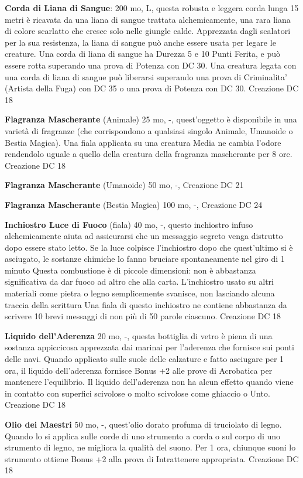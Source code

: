 \documentclass[a4paper,11pt,twoside,openany]{book}
\begin{document}
\textbf{Corda di Liana di Sangue}: 200 mo, L, questa robusta e leggera corda lunga 15 metri è ricavata da una liana di sangue trattata alchemicamente, una rara liana di colore scarlatto che cresce solo nelle giungle calde.
Apprezzata dagli scalatori per la sua resistenza, la liana di sangue può anche essere usata per legare le creature. Una corda di liana di sangue ha Durezza 5 e 10 Punti Ferita, e può essere rotta superando una prova di Potenza con DC 30.
Una creatura legata con una corda di liana di sangue può liberarsi superando una prova di Criminalita’ (Artista della Fuga) con DC 35 o una prova di Potenza con DC 30. Creazione DC 18

\textbf{Flagranza Mascherante} (Animale) 25 mo, -, quest'oggetto è disponibile in una varietà di fragranze (che corrispondono a qualsiasi singolo Animale, Umanoide o Bestia Magica). Una fiala applicata su una creatura Media ne cambia l'odore rendendolo uguale a quello della creatura della fragranza mascherante per 8 ore. Creazione DC 18

\textbf{Flagranza Mascherante} (Umanoide) 50 mo, -, Creazione DC 21

\textbf{Flagranza Mascherante} (Bestia Magica) 100 mo, -, Creazione DC 24

\textbf{Inchiostro Luce di Fuoco} (fiala) 40 mo, -, questo inchiostro infuso alchemicamente aiuta ad assicurarsi che un messaggio segreto venga distrutto dopo essere stato letto. Se la luce colpisce l'inchiostro dopo che quest'ultimo si è asciugato, le sostanze chimiche lo fanno bruciare spontaneamente nel giro di 1 minuto
Questa combustione è di piccole dimensioni: non è abbastanza significativa da dar fuoco ad altro che alla carta. L'inchiostro usato su altri materiali come pietra o legno semplicemente svanisce, non lasciando alcuna traccia della scrittura
Una fiala di questo inchiostro ne contiene abbastanza da scrivere 10 brevi messaggi di non più di 50 parole ciascuno. Creazione DC 18

\textbf{Liquido dell'Aderenza} 20 mo, -, questa bottiglia di vetro è piena di una sostanza appiccicosa apprezzata dai marinai per l'aderenza che fornisce sui ponti delle navi. Quando applicato sulle suole delle calzature e fatto asciugare per 1 ora, il liquido dell'aderenza fornisce Bonus +2 alle prove di Acrobatica per mantenere l'equilibrio.
Il liquido dell'aderenza non ha alcun effetto quando viene in contatto con superfici scivolose o molto scivolose come ghiaccio o Unto. Creazione DC 18

\textbf{Olio dei Maestri} 50 mo, -, quest'olio dorato profuma di truciolato di legno. Quando lo si applica sulle corde di uno strumento a corda o sul corpo di uno strumento di legno, ne migliora la qualità del suono. Per 1 ora, chiunque suoni lo strumento ottiene Bonus +2 alla prova di Intrattenere appropriata. Creazione DC 18
\end{document}
